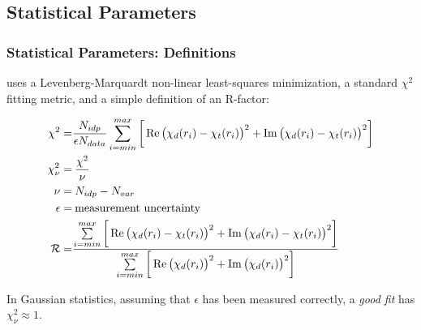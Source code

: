 \documentclass[10pt, xcolor=x11names, compress]{beamer}
\begin{document}
\subsection[Parameters]{Statistical Parameters}
\begin{frame}
  \frametitle{Statistical Parameters: Definitions}
  
  {\ifeffit} uses a Levenberg-Marquardt non-linear least-squares
  minimization, a standard $\chi^2$ fitting metric, and a simple
  definition of an R-factor:

  {\small
    \begin{align}
      \chi^2      =& \frac{N_{idp}}{\epsilon N_{data}}
                     \sum\limits_{i=min}^{max} 
                       \bigg[\Re\big(\chi_d(r_i)-\chi_t(r_i)\big)^2 + 
                             \Im\big(\chi_d(r_i)-\chi_t(r_i)\big)^2\bigg]
                     \label{eq:chisqr} \\
      \chi_\nu^2  =& \> \frac{\chi^2}{\nu} \label{eq:chinu} \\
      \nu         =& \> N_{idp} - N_{var} \label{eq:nu} \\
      \epsilon    =& \> \textrm{measurement uncertainty} \notag \\
      \mathcal{R} =& \frac{\sum\limits_{i=min}^{max} 
                             \bigg[\Re\big(\chi_d(r_i)-\chi_t(r_i)\big)^2 + 
                                   \Im\big(\chi_d(r_i)-\chi_t(r_i)\big)^2\bigg]}
                          {\sum\limits_{i=min}^{max} 
                             \bigg[\Re\big(\chi_d(r_i)\big)^2 + 
                                   \Im\big(\chi_d(r_i)\big)^2\bigg]} 
                     \label{eq:rfactor}
    \end{align}
  }
  \begin{block}{}
    In Gaussian statistics, assuming that $\epsilon$ has been measured
    correctly, a \textit{good fit} has $\chi_\nu^2\approx1$.
  \end{block}
\end{frame}
\end{document}
